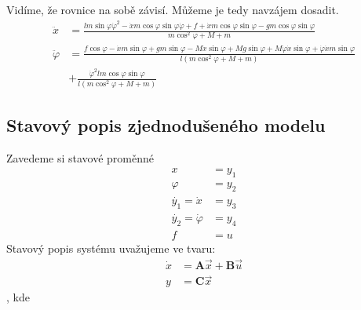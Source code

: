 \documentclass[a4paper, 12pt]{article}
\begin{document}
			Vidíme, že rovnice na sobě závisí. Můžeme je tedy navzájem dosadit.
			\begin{align*}
				\ddot{x} &= \frac{lm\sin\varphi\dot{\varphi}^2-\dot{x}m\cos\varphi\sin\varphi\dot{\varphi}+f+\dot{x}m\cos\varphi\sin\varphi-gm\cos\varphi\sin\varphi}{m\cos^2\varphi+M+m}\\
				\ddot{\varphi} &= \frac{f\cos\varphi-\dot{x}m\sin\varphi+gm\sin\varphi-M\dot{x}\sin\varphi+Mg\sin\varphi+M\dot{\varphi}\dot{x}\sin\varphi+\dot{\varphi}\dot{x}m\sin\varphi}{l\left(m\cos^2\varphi+M+m\right)}\\
				&+ \frac{\dot{\varphi}^2lm\cos\varphi\sin\varphi}{l\left(m\cos^2\varphi+M+m\right)}
			\end{align*}
		\subsection{Stavový popis zjednodušeného modelu}
			Zavedeme si stavové proměnné
			\begin{align*}
				x &= y_1\\
				\varphi &= y_2\\
				\dot{y_1} = \dot{x} &= y_3\\
				\dot{y_2} = \dot{\varphi} &= y_4\\
				f &= u
			\end{align*}
			Stavový popis systému uvažujeme ve tvaru:
			\begin{align*}
				\dot{x} &= \mathbf{A}\vec{x}+\mathbf{B}\vec{u}\\
				y &= \mathbf{C}\vec{x}   %
			\end{align*}
			, kde 
\end{document}
